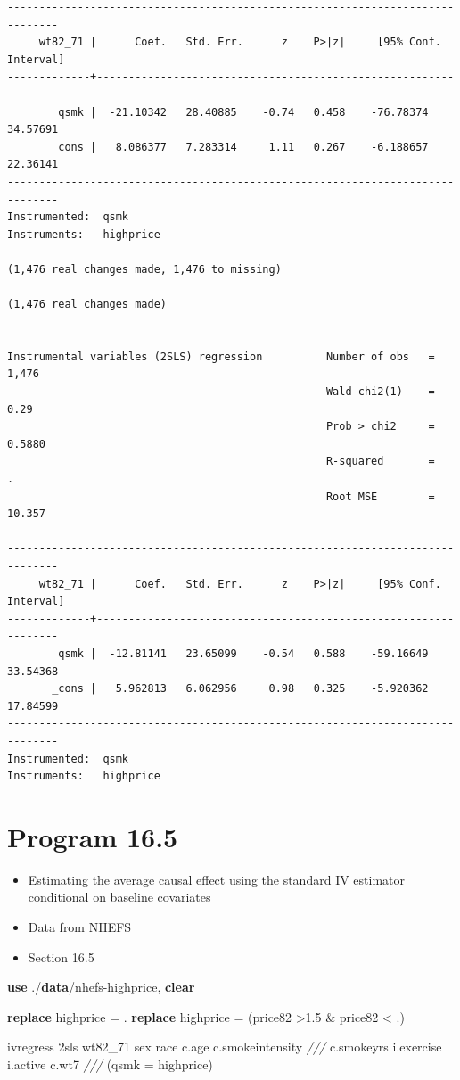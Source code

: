 \documentclass[
  10pt,
]{book}
\newenvironment{Shaded}{\begin{snugshade}}{\end{snugshade}}
\newcommand{\CommentTok}[1]{\textcolor[rgb]{0.56,0.35,0.01}{\textit{#1}}}
\newcommand{\KeywordTok}[1]{\textcolor[rgb]{0.13,0.29,0.53}{\textbf{#1}}}
\newcommand{\NormalTok}[1]{#1}
\providecommand{\tightlist}{%
  \setlength{\itemsep}{0pt}\setlength{\parskip}{0pt}}
\begin{document}
\begin{verbatim}
------------------------------------------------------------------------------
     wt82_71 |      Coef.   Std. Err.      z    P>|z|     [95% Conf. Interval]
-------------+----------------------------------------------------------------
        qsmk |  -21.10342   28.40885    -0.74   0.458    -76.78374    34.57691
       _cons |   8.086377   7.283314     1.11   0.267    -6.188657    22.36141
------------------------------------------------------------------------------
Instrumented:  qsmk
Instruments:   highprice

(1,476 real changes made, 1,476 to missing)

(1,476 real changes made)


Instrumental variables (2SLS) regression          Number of obs   =      1,476
                                                  Wald chi2(1)    =       0.29
                                                  Prob > chi2     =     0.5880
                                                  R-squared       =          .
                                                  Root MSE        =     10.357

------------------------------------------------------------------------------
     wt82_71 |      Coef.   Std. Err.      z    P>|z|     [95% Conf. Interval]
-------------+----------------------------------------------------------------
        qsmk |  -12.81141   23.65099    -0.54   0.588    -59.16649    33.54368
       _cons |   5.962813   6.062956     0.98   0.325    -5.920362    17.84599
------------------------------------------------------------------------------
Instrumented:  qsmk
Instruments:   highprice
\end{verbatim}

\hypertarget{program-16.5}{%
\section{Program 16.5}\label{program-16.5}}

\begin{itemize}
\tightlist
\item
  Estimating the average causal effect using the standard IV estimator conditional on baseline covariates
\item
  Data from NHEFS
\item
  Section 16.5
\end{itemize}

\begin{Shaded}
\begin{Highlighting}[]
\KeywordTok{use}\NormalTok{ ./}\KeywordTok{data}\NormalTok{/nhefs-highprice, }\KeywordTok{clear}

\KeywordTok{replace}\NormalTok{ highprice = .}
\KeywordTok{replace}\NormalTok{ highprice = (price82 >1.5 & price82 < .)}

\NormalTok{ivregress 2sls wt82_71 sex race c.age c.smokeintensity }\CommentTok{///}
\NormalTok{  c.smokeyrs i.exercise i.active c.wt7 }\CommentTok{///}
\NormalTok{  (qsmk = highprice)}
\end{Highlighting}
\end{Shaded}
\end{document}
